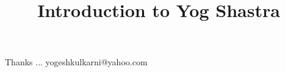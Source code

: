 \documentclass[xcolor=dvipsnames,compress,t,pdf,9pt]{beamer}
\title[\insertframenumber /\inserttotalframenumber]{Introduction to Yog Shastra}
\begin{document}
	\begin{frame}
	\titlepage
%
	\end{frame}
	
%	
	
	
	\begin{frame}[c]{}
	Thanks ...
	\vspace{5mm}
	yogeshkulkarni@yahoo.com
	\end{frame}
\end{document}
